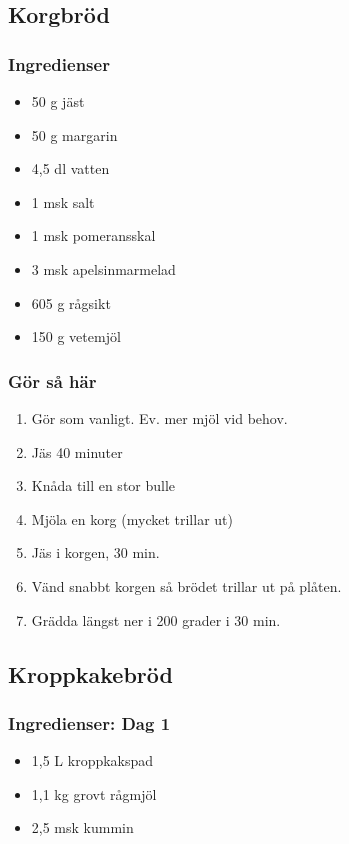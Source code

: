 \documentclass[a4paper,11pt,twocolumn]{article}
\begin{document}
\subsection{Korgbröd}
\subsubsection*{Ingredienser}
\begin{itemize}[noitemsep]
    \item 50 g jäst
    \item 50 g margarin
    \item 4,5 dl vatten
    \item 1 msk salt
    \item 1 msk pomeransskal
    \item 3 msk apelsinmarmelad
    \item 605 g rågsikt
    \item 150 g vetemjöl
\end{itemize}
\subsubsection*{Gör så här}
\begin{enumerate}[label=\arabic*.]
    \item Gör som vanligt. Ev. mer mjöl vid behov.
    \item Jäs 40 minuter
    \item Knåda till en stor bulle
    \item Mjöla en korg (mycket trillar ut)
    \item Jäs i korgen, 30 min.
    \item Vänd snabbt korgen så brödet trillar ut på plåten.
    \item Grädda längst ner i 200 grader i 30 min.
\end{enumerate}


\subsection{Kroppkakebröd}
\subsubsection*{Ingredienser: Dag 1}
\begin{itemize}[noitemsep]
    \item 1,5 L kroppkakspad
    \item 1,1 kg grovt rågmjöl
    \item 2,5 msk kummin
\end{itemize}
\end{document}
